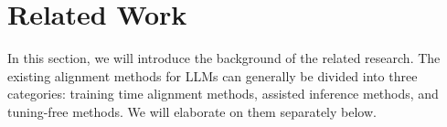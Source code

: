 \section{Related Work}
\label{sec:related_work}

\vspace{-1.5ex}

In this section, we will introduce the background of the related research. The existing alignment methods for LLMs can generally be divided into three categories: training time alignment methods, assisted inference methods, and tuning-free methods. We will elaborate on them separately below.

\vspace{-1.5ex}


